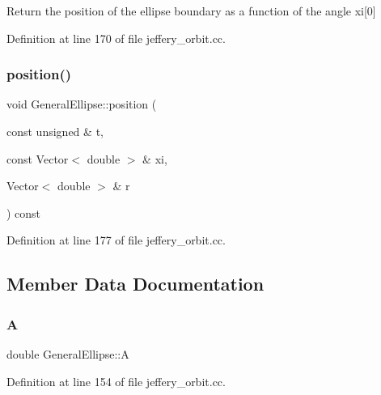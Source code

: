 Return the position of the ellipse boundary as a function of the angle xi\mbox{[}0\mbox{]} 

Definition at line 170 of file jeffery\+\_\+orbit.\+cc.

\mbox{\label{classGeneralEllipse_a2bdcc69fcb1f1725124d625c032d171a}} 
\subsubsection{\texorpdfstring{position()}{position()}\hspace{0.1cm}{\footnotesize\ttfamily [2/2]}}
{\footnotesize\ttfamily void General\+Ellipse\+::position (\begin{DoxyParamCaption}\item[{const unsigned \&}]{t,  }\item[{const Vector$<$ double $>$ \&}]{xi,  }\item[{Vector$<$ double $>$ \&}]{r }\end{DoxyParamCaption}) const\hspace{0.3cm}{\ttfamily [inline]}}



Definition at line 177 of file jeffery\+\_\+orbit.\+cc.



\subsection{Member Data Documentation}
\mbox{\label{classGeneralEllipse_ae583e1437da6ad4eb228dda60b61808a}} 
\subsubsection{\texorpdfstring{A}{A}}
{\footnotesize\ttfamily double General\+Ellipse\+::A\hspace{0.3cm}{\ttfamily [private]}}



Definition at line 154 of file jeffery\+\_\+orbit.\+cc.

\mbox{\label{classGeneralEllipse_a185ae9786d5c6c82eef61e163e9310c6}} 
